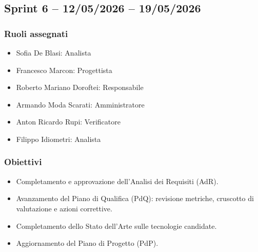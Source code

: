 \subsection{Sprint 6 -- 12/05/2026 -- 19/05/2026}
\label{sec:sprint6}

\subsubsection{Ruoli assegnati}
\begin{itemize}
    \item Sofia De Blasi: Analista
    \item Francesco Marcon: Progettista
    \item Roberto Mariano Doroftei: Responsabile
    \item Armando Moda Scarati: Amministratore
    \item Anton Ricardo Rupi: Verificatore
    \item Filippo Idiometri: Analista
\end{itemize}

\subsubsection{Obiettivi}
\begin{itemize}
    \item Completamento e approvazione dell'Analisi dei Requisiti (AdR).
    \item Avanzamento del Piano di Qualifica (PdQ): revisione metriche,
          cruscotto di valutazione e azioni correttive.
    \item Completamento dello Stato dell'Arte sulle tecnologie candidate.
    \item Aggiornamento del Piano di Progetto (PdP).
\end{itemize}

